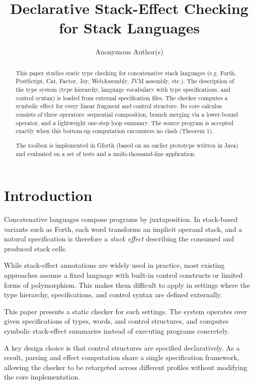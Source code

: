 \documentclass[acmsmall,screen,review,anonymous,nonacm]{acmart}
\title{Declarative Stack-Effect Checking for Stack Languages}
\author{Anonymous Author(s)}
\begin{document}
\begin{abstract}
This paper studies static type checking for concatenative stack languages (e.g. Forth, PostScript,
Cat, Factor, Joy, WebAssembly, JVM assembly, etc.). The description of the type system (type hierarchy,
language vocabulary with type specifications, and control syntax) is loaded from external specification 
files.
The checker computes a symbolic effect for every linear fragment and control structure. 
Its core calculus consists of three operators: sequential composition, branch merging via
a lower-bound operator, and a lightweight one-step loop summary.
The source program is accepted exactly when this bottom-up computation encounters no clash (Theorem 1).

The toolbox is implemented in Gforth (based on an earlier prototype written in Java) and evaluated on a set 
of tests and a multi-thousand-line application.
\end{abstract}

\maketitle

\section{Introduction}
Concatenative languages compose programs by juxtaposition. In stack-based variants such
as Forth, each word transforms an implicit operand stack, and a natural specification is
therefore a \emph{stack effect} describing the consumed and produced stack cells.

While stack-effect annotations are widely used in practice, most existing approaches
assume a fixed language with built-in control constructs or limited forms of
polymorphism. This makes them difficult to apply in settings where the type hierarchy,
specifications, and control syntax are defined externally.

This paper presents a static checker for such settings. The system operates over
given specifications of types, words, and control structures, and computes
symbolic stack-effect summaries instead of executing programs concretely.

A key design choice is that control structures are specified declaratively. As a result,
parsing and effect computation share a single specification framework, allowing the
checker to be retargeted across different profiles without modifying the core
implementation.
\end{document}
